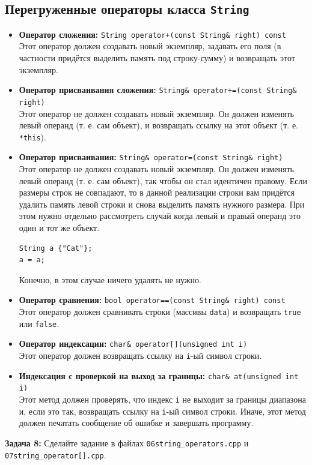\documentclass{article}
\begin{document}
\subsection*{Перегруженные операторы класса \texttt{String}}
\begin{itemize}
\item \textbf{Оператор сложения:} \texttt{String operator+(const String\& right) const} \\
Этот оператор должен создавать новый экземпляр, задавать его поля (в частности придётся выделить память под строку-сумму) и возвращать этот экземпляр.

\item \textbf{Оператор присваивания сложения:} \texttt{String\& operator+=(const String\& right)}\\
Этот оператор не должен создавать новый экземпляр. Он должен изменять левый операнд (т. е. сам объект), и возвращать ссылку на этот объект (т. е. \texttt{*this}).

\item \textbf{Оператор присваивания:} \texttt{String\& operator=(const String\& right)}\\
Этот оператор не должен создавать новый экземпляр. Он должен изменять левый операнд (т. е. сам объект), так чтобы он стал идентичен правому. Если размеры строк не совпадают, то в данной реализации строки вам придётся удалить память левой строки и снова выделить память нужного размера. При этом нужно отдельно рассмотреть случай когда левый и правый операнд это один и тот же объект. 
\begin{lstlisting}
String a {"Cat"};
a = a;
\end{lstlisting}
Конечно, в этом случае ничего удалять не нужно.

\item \textbf{Оператор сравнения:} \texttt{bool operator==(const String\& right) const}\\
Этот оператор должен сравнивать строки (массивы \texttt{data}) и возвращать \texttt{true} или \texttt{false}.

\item \textbf{Оператор индексации:} \texttt{char\& operator[](unsigned int i)}\\
Этот оператор должен возвращать ссылку на \texttt{i}-ый символ строки.

\item \textbf{Индексация с проверкой на выход за границы:} \texttt{char\& at(unsigned int i)}\\
Этот метод должен проверять, что индекс \texttt{i} не выходит за границы диапазона и, если это так, возвращать ссылку на \texttt{i}-ый символ строки. Иначе, этот метод должен печатать сообщение об ошибке и завершать программу.
\end{itemize}
\textbf{Задача 8:} Сделайте задание в файлах \texttt{06string\_operators.cpp} и \texttt{07string\_operator[].cpp}.
\end{document}
